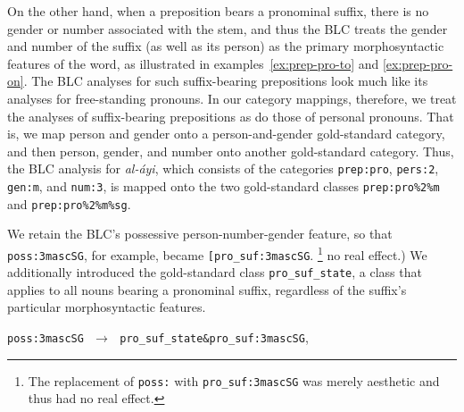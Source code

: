 \begin{description}
On the other hand, when a preposition bears a pronominal suffix, there is no gender 
or number associated with the stem, and thus the BLC treats the gender and 
number of the suffix (as well as its person) 
as the primary morphosyntactic features of the word, as illustrated in 
examples~\ref{ex:prep-pro-to} 
and \ref{ex:prep-pro-on}. The BLC analyses for such suffix-bearing 
prepositions look much 
like its analyses for free-standing pronouns. 
In our category mappings, therefore, we treat the analyses of suffix-bearing 
prepositions as do those 
of personal pronouns. That is, we map person and gender onto a person-and-gender gold-standard
category, and then person, gender, and number onto another gold-standard category.
Thus, the BLC analysis for \textit{al-\'{a}yi}, which consists of the categories \texttt{prep:pro}, \texttt{pers:2}, \texttt{gen:m}, and \texttt{num:3}, is mapped onto the two gold-standard classes \texttt{prep:pro\%2\%m} and 
\texttt{prep:pro\%2\%m\%sg}.

We retain the BLC's possessive person-number-gender feature, so that \texttt{poss:3mascSG},
for example, became \texttt{[pro\_suf:3mascSG}. \footnote{The replacement of \texttt{poss:} with 
\texttt{pro\_suf:3mascSG} was merely aesthetic and thus had no real effect.}
no real effect.) We additionally introduced the gold-standard class \texttt{pro\_suf\_state}, a class that applies to
all nouns bearing a pronominal suffix, regardless of the suffix's particular
morphosyntactic features. 
\begin{exe}
\ex \label{ex:mapping-pron-suf}
\texttt{poss:3mascSG}  $\,\,\to\,\,$ \texttt{pro\_suf\_state\&pro\_suf:3mascSG}, 
\end{exe}






%
%




\end{description}
